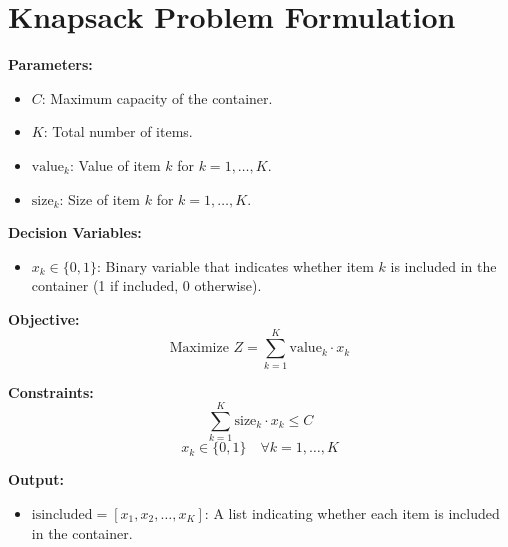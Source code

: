\documentclass{article}
\begin{document}
\section*{Knapsack Problem Formulation}

\textbf{Parameters:}
\begin{itemize}
    \item \( C \): Maximum capacity of the container.
    \item \( K \): Total number of items.
    \item \( \text{value}_{k} \): Value of item \( k \) for \( k = 1, \ldots, K \).
    \item \( \text{size}_{k} \): Size of item \( k \) for \( k = 1, \ldots, K \).
\end{itemize}

\textbf{Decision Variables:}
\begin{itemize}
    \item \( x_{k} \in \{0, 1\} \): Binary variable that indicates whether item \( k \) is included in the container (1 if included, 0 otherwise).
\end{itemize}

\textbf{Objective:}
\begin{equation}
    \text{Maximize } Z = \sum_{k=1}^{K} \text{value}_{k} \cdot x_{k}
\end{equation}

\textbf{Constraints:}
\begin{equation}
    \sum_{k=1}^{K} \text{size}_{k} \cdot x_{k} \leq C
\end{equation}
\begin{equation}
    x_{k} \in \{0, 1\} \quad \forall k = 1, \ldots, K
\end{equation}

\textbf{Output:}
\begin{itemize}
    \item \( \text{isincluded} = [x_{1}, x_{2}, \ldots, x_{K}] \): A list indicating whether each item is included in the container.
\end{itemize}
\end{document}
